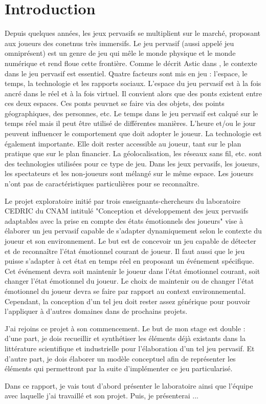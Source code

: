 \documentclass{article}
\begin{document}
\section{Introduction}
	Depuis quelques années, les jeux pervasifs se multiplient sur le marché, proposant aux joueurs des conetnus très immersifs.
	Le jeu pervasif (aussi appelé jeu omniprésent) est un genre de jeu qui mêle le monde physique et le monde numérique et rend floue cette frontière.
	Comme le décrit Astic dans \cite{astic_2013}, le contexte dans le jeu pervasif est essentiel. 
	Quatre facteurs sont mis en jeu : l'espace, le temps, la technologie et les rapports sociaux. 
	L'espace du jeu pervasif est à la fois ancré dans le réel et à la fois virtuel.
	Il convient alors que des ponts existent entre ces deux espaces. 
	Ces ponts peuvnet se faire via des objets, des points géographiques, des personnes, etc. 
	Le temps dans le jeu pervasif est calqué sur le temps réel mais il peut être utilisé de différentes manières. 
	L'heure et/ou le jour peuvent influencer le comportement que doit adopter le joueur.
	La technologie est également importante. Elle doit rester accessible au joueur, tant sur le plan pratique que sur le plan financier. La géolocalisation, les réseaux sans fil, etc. sont des technologies utilisées pour ce type de jeu.
	Dans les jeux pervasifs, les joueurs, les spectateurs et les non-joueurs sont mélangé sur le même espace. Les joueurs n'ont pas de caractéristiques particulières pour se reconnaître.\par
	Le projet exploratoire initié par trois enseignants-chercheurs du laboratoire CEDRIC du CNAM intitulé "Conception et développement des jeux pervasifs adaptables avec la prise en compte des états émotionnels des joueurs" vise à élaborer un jeu pervasif capable de s'adapter dynamiquement selon le contexte du joueur et son environnement. Le but est de concevoir un jeu capable de détecter et de reconnaître l'état émotionnel courant de joueur. Il faut aussi que le jeu puisse s'adapter à cet état en temps réel en proposant un événement spécifique. Cet événement devra soit maintenir le joueur dans l'état émotionnel courant, soit changer l'état émotionnel du joueur. Le choix de maintenir ou de changer l'état émotionnel du joueur devra se faire par rapport au context environnemental.
	Cependant, la conception d'un tel jeu doit rester assez générique pour pouvoir l'appliquer à d'autres domaines dans de prochains projets.\par
	J'ai rejoins ce projet à son commencement. 
	Le but de mon stage est double : 
	d'une part, je dois recueillir et synthétiser les éléments déjà existants dans la littérature scientifique et industrielle pour l'élaboration d'un tel jeu pervasif. 
	Et d'autre part, je dois élaborer un modèle conceptuel afin de représenter les éléments qui permettront par la suite d'implémenter ce jeu particularisé.\par
	Dans ce rapport, je vais tout d'abord présenter le laboratoire ainsi que l'équipe avec laquelle j'ai travaillé et son projet. Puis, je présenterai ...
\end{document}
